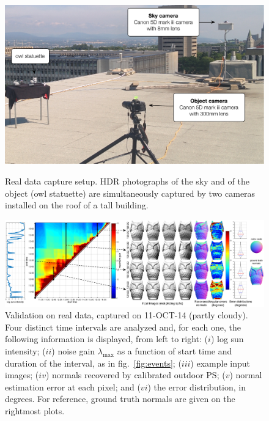 \begin{figure}[!t]
    \centering
    \includegraphics[width=.92\linewidth]{./figures/realData/realData-setup.pdf} \\[1mm]
    \caption{Real data capture setup. HDR photographs of the sky and of the object (owl statuette) are simultaneously captured by two cameras installed on the roof of a tall building.}
    \label{fig:real-data-setup}
    \vspace{-2mm}
\end{figure}

\begin{figure}[t]
    \centering
    \includegraphics[width=\linewidth]{./figures/realData/realData4.pdf}
    \caption{Validation on real data, captured on 11-OCT-14 (partly cloudy). Four distinct time intervals are analyzed and, for each one, the following information is displayed, from left to right: ($i$) log sun intensity; ($ii$) noise gain $\lambda_\text{max}$ as a function of start time and duration of the interval, as in fig.~\ref{fig:events}; ($iii$) example input images; ($iv$) normals recovered by calibrated outdoor PS; ($v$) normal estimation error at each pixel; and ($vi$) the error distribution, in degrees. For reference, ground truth normals are given on the rightmost plots.}
    \label{fig:real-results}
    \vspace{-2mm}
\end{figure}

